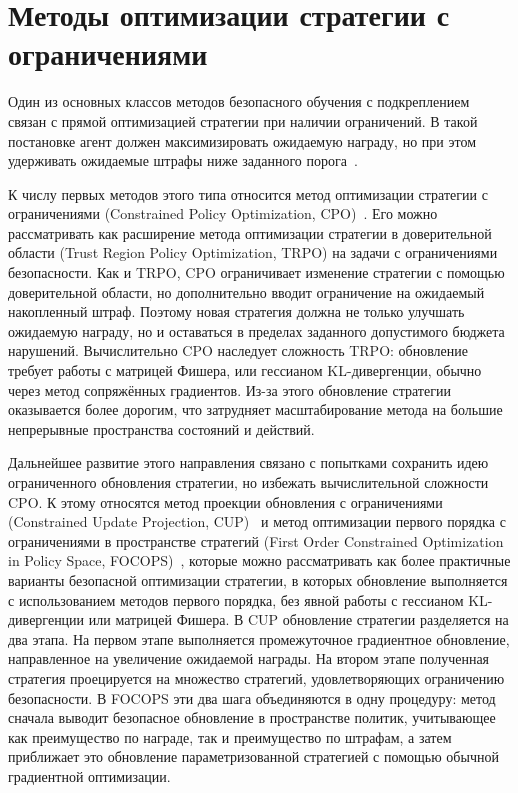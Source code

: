 \section{Методы оптимизации стратегии с ограничениями}
\label{sec:constrained_policy_optimization}

Один из основных классов методов безопасного обучения с подкреплением связан с прямой оптимизацией стратегии при наличии ограничений. В такой постановке агент должен максимизировать ожидаемую награду, но при этом удерживать ожидаемые штрафы ниже заданного порога~\cite{gu2022review,altman1999constrained}.

К числу первых методов этого типа относится метод оптимизации стратегии с ограничениями (Constrained Policy Optimization, CPO)~\cite{achiam2017cpo}. Его можно рассматривать как расширение метода оптимизации стратегии в доверительной области (Trust Region Policy Optimization, TRPO) на задачи с ограничениями безопасности. Как и TRPO, CPO ограничивает изменение стратегии с помощью доверительной области, но дополнительно вводит ограничение на ожидаемый накопленный штраф. Поэтому новая стратегия должна не только улучшать ожидаемую награду, но и оставаться в пределах заданного допустимого бюджета нарушений. Вычислительно CPO наследует сложность TRPO: обновление требует работы с матрицей Фишера, или гессианом KL-дивергенции, обычно через метод сопряжённых градиентов. Из-за этого обновление стратегии оказывается более дорогим, что затрудняет масштабирование метода на большие непрерывные пространства состояний и действий.

Дальнейшее развитие этого направления связано с попытками сохранить идею ограниченного обновления стратегии, но избежать вычислительной сложности CPO. К этому относятся метод проекции обновления с ограничениями (Constrained Update Projection, CUP)~\cite{cup} и метод оптимизации первого порядка с ограничениями в пространстве стратегий (First Order Constrained Optimization in Policy Space, FOCOPS)~\cite{focops}, которые можно рассматривать как более практичные варианты безопасной оптимизации стратегии, в которых обновление выполняется с использованием методов первого порядка, без явной работы с гессианом KL-дивергенции или матрицей Фишера. В CUP обновление стратегии разделяется на два этапа. На первом этапе выполняется промежуточное градиентное обновление, направленное на увеличение ожидаемой награды. На втором этапе полученная стратегия проецируется на множество стратегий, удовлетворяющих ограничению безопасности. В FOCOPS эти два шага объединяются в одну процедуру: метод сначала выводит безопасное обновление в пространстве политик, учитывающее как преимущество по награде, так и преимущество по штрафам, а затем приближает это обновление параметризованной стратегией с помощью обычной градиентной оптимизации.

